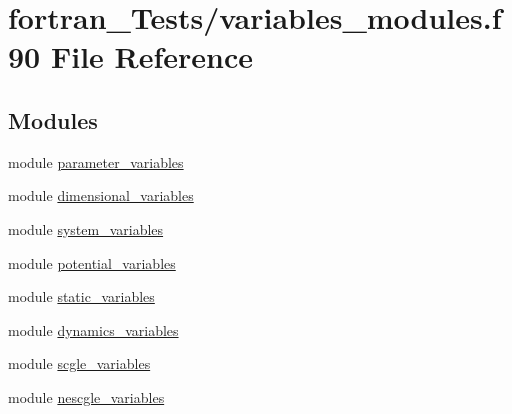 \hypertarget{variables__modules_8f90}{}\section{fortran\+\_\+\+Tests/variables\+\_\+modules.f90 File Reference}
\label{variables__modules_8f90}
\subsection*{Modules}
\begin{DoxyCompactItemize}
\item 
module \hyperlink{namespaceparameter__variables}{parameter\+\_\+variables}
\item 
module \hyperlink{namespacedimensional__variables}{dimensional\+\_\+variables}
\item 
module \hyperlink{namespacesystem__variables}{system\+\_\+variables}
\item 
module \hyperlink{namespacepotential__variables}{potential\+\_\+variables}
\item 
module \hyperlink{namespacestatic__variables}{static\+\_\+variables}
\item 
module \hyperlink{namespacedynamics__variables}{dynamics\+\_\+variables}
\item 
module \hyperlink{namespacescgle__variables}{scgle\+\_\+variables}
\item 
module \hyperlink{namespacenescgle__variables}{nescgle\+\_\+variables}
\end{DoxyCompactItemize}
